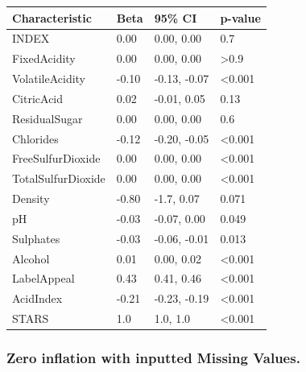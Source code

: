 \documentclass[]{elsarticle} %
\begin{document}
\begin{longtable}[]{@{}llll@{}}
\toprule
\textbf{Characteristic} & \textbf{Beta} & \textbf{95\% CI} &
\textbf{p-value}\tabularnewline
\midrule
\endhead
INDEX & 0.00 & 0.00, 0.00 & 0.7\tabularnewline
FixedAcidity & 0.00 & 0.00, 0.00 & \textgreater0.9\tabularnewline
VolatileAcidity & -0.10 & -0.13, -0.07 & \textless0.001\tabularnewline
CitricAcid & 0.02 & -0.01, 0.05 & 0.13\tabularnewline
ResidualSugar & 0.00 & 0.00, 0.00 & 0.6\tabularnewline
Chlorides & -0.12 & -0.20, -0.05 & \textless0.001\tabularnewline
FreeSulfurDioxide & 0.00 & 0.00, 0.00 & \textless0.001\tabularnewline
TotalSulfurDioxide & 0.00 & 0.00, 0.00 & \textless0.001\tabularnewline
Density & -0.80 & -1.7, 0.07 & 0.071\tabularnewline
pH & -0.03 & -0.07, 0.00 & 0.049\tabularnewline
Sulphates & -0.03 & -0.06, -0.01 & 0.013\tabularnewline
Alcohol & 0.01 & 0.00, 0.02 & \textless0.001\tabularnewline
LabelAppeal & 0.43 & 0.41, 0.46 & \textless0.001\tabularnewline
AcidIndex & -0.21 & -0.23, -0.19 & \textless0.001\tabularnewline
STARS & 1.0 & 1.0, 1.0 & \textless0.001\tabularnewline
\bottomrule
\end{longtable}

\hypertarget{zero-inflation-with-inputted-missing-values.}{%
\subsubsection{Zero inflation with inputted Missing
Values.}\label{zero-inflation-with-inputted-missing-values.}}
\end{document}

